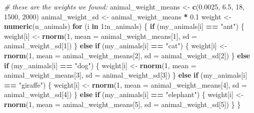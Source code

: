 \documentclass[]{article}
\newenvironment{Shaded}{\begin{snugshade}}{\end{snugshade}}
\newcommand{\CommentTok}[1]{\textcolor[rgb]{0.56,0.35,0.01}{\textit{#1}}}
\newcommand{\ControlFlowTok}[1]{\textcolor[rgb]{0.13,0.29,0.53}{\textbf{#1}}}
\newcommand{\DataTypeTok}[1]{\textcolor[rgb]{0.13,0.29,0.53}{#1}}
\newcommand{\DecValTok}[1]{\textcolor[rgb]{0.00,0.00,0.81}{#1}}
\newcommand{\FloatTok}[1]{\textcolor[rgb]{0.00,0.00,0.81}{#1}}
\newcommand{\KeywordTok}[1]{\textcolor[rgb]{0.13,0.29,0.53}{\textbf{#1}}}
\newcommand{\NormalTok}[1]{#1}
\newcommand{\OperatorTok}[1]{\textcolor[rgb]{0.81,0.36,0.00}{\textbf{#1}}}
\newcommand{\StringTok}[1]{\textcolor[rgb]{0.31,0.60,0.02}{#1}}
\begin{document}
\begin{Shaded}
\begin{Highlighting}[]
\CommentTok{# these are the weights we found:}
\NormalTok{animal_weight_means <-}\StringTok{ }\KeywordTok{c}\NormalTok{(}\FloatTok{0.0025}\NormalTok{, }\FloatTok{6.5}\NormalTok{, }\DecValTok{18}\NormalTok{, }\DecValTok{1500}\NormalTok{, }\DecValTok{2000}\NormalTok{)}
\NormalTok{animal_weight_sd <-}\StringTok{ }\NormalTok{animal_weight_means }\OperatorTok{*}\StringTok{ }\FloatTok{0.1}
\NormalTok{weight <-}\StringTok{ }\KeywordTok{numeric}\NormalTok{(n_animals)}
\ControlFlowTok{for}\NormalTok{ (i }\ControlFlowTok{in} \DecValTok{1}\OperatorTok{:}\NormalTok{n_animals) \{}
  \ControlFlowTok{if}\NormalTok{ (my_animals[i] }\OperatorTok{==}\StringTok{ "ant"}\NormalTok{) \{}
\NormalTok{    weight[i] <-}\StringTok{ }\KeywordTok{rnorm}\NormalTok{(}\DecValTok{1}\NormalTok{, }\DataTypeTok{mean =}\NormalTok{ animal_weight_means[}\DecValTok{1}\NormalTok{], }\DataTypeTok{sd =}\NormalTok{ animal_weight_sd[}\DecValTok{1}\NormalTok{])}
\NormalTok{  \} }\ControlFlowTok{else} \ControlFlowTok{if}\NormalTok{ (my_animals[i] }\OperatorTok{==}\StringTok{ "cat"}\NormalTok{) \{}
\NormalTok{    weight[i] <-}\StringTok{ }\KeywordTok{rnorm}\NormalTok{(}\DecValTok{1}\NormalTok{, }\DataTypeTok{mean =}\NormalTok{ animal_weight_means[}\DecValTok{2}\NormalTok{], }\DataTypeTok{sd =}\NormalTok{ animal_weight_sd[}\DecValTok{2}\NormalTok{])}
\NormalTok{  \} }\ControlFlowTok{else} \ControlFlowTok{if}\NormalTok{ (my_animals[i] }\OperatorTok{==}\StringTok{ "dog"}\NormalTok{) \{}
\NormalTok{    weight[i] <-}\StringTok{ }\KeywordTok{rnorm}\NormalTok{(}\DecValTok{1}\NormalTok{, }\DataTypeTok{mean =}\NormalTok{ animal_weight_means[}\DecValTok{3}\NormalTok{], }\DataTypeTok{sd =}\NormalTok{ animal_weight_sd[}\DecValTok{3}\NormalTok{])}
\NormalTok{  \} }\ControlFlowTok{else} \ControlFlowTok{if}\NormalTok{ (my_animals[i] }\OperatorTok{==}\StringTok{ "giraffe"}\NormalTok{) \{}
\NormalTok{    weight[i] <-}\StringTok{ }\KeywordTok{rnorm}\NormalTok{(}\DecValTok{1}\NormalTok{, }\DataTypeTok{mean =}\NormalTok{  animal_weight_means[}\DecValTok{4}\NormalTok{], }\DataTypeTok{sd =}\NormalTok{ animal_weight_sd[}\DecValTok{4}\NormalTok{])}
\NormalTok{  \} }\ControlFlowTok{else} \ControlFlowTok{if}\NormalTok{ (my_animals[i] }\OperatorTok{==}\StringTok{ "elephant"}\NormalTok{) \{}
\NormalTok{    weight[i] <-}\StringTok{ }\KeywordTok{rnorm}\NormalTok{(}\DecValTok{1}\NormalTok{, }\DataTypeTok{mean =}\NormalTok{ animal_weight_means[}\DecValTok{5}\NormalTok{], }\DataTypeTok{sd =}\NormalTok{ animal_weight_sd[}\DecValTok{5}\NormalTok{])}
\NormalTok{  \} }
\NormalTok{\}}
\end{Highlighting}
\end{Shaded}
\end{document}
